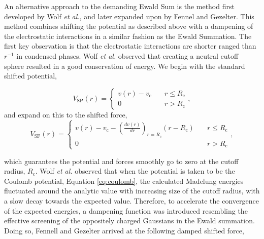 An alternative approach to the demanding Ewald Sum is the method first
developed by Wolf \textit{et al.}, and later expanded upon by Fennel
and Gezelter.\cite{Fennell2006} This method combines shifting the
potential as described above with a dampening of the electrostatic
interactions in a similar fashion as the Ewald Summation. The first
key observation is that the electrostatic interactions are shorter
ranged than $r^{-1}$ in condensed phases. Wolf \textit{et al.}
observed that creating a neutral cutoff sphere resulted in a
good conservation of energy. We begin with the standard shifted potential,

\begin{equation}
V_\textrm{SP}(r) =      \begin{cases}
v(r)-v_\textrm{c} &\quad r\leqslant R_\textrm{c} \\ 0 &\quad r >
R_\textrm{c}  
\end{cases},
\label{eq:shiftingPotForm}
\end{equation}
and expand on this to the shifted force,
\begin{equation}
V_\textrm{SF}(r) =      \begin{cases}
v(r)-v_\textrm{c}-\left(\frac{d v(r)}{d r}\right)_{r=R_\textrm{c}}(r-R_\textrm{c
})
&\quad r\leqslant R_\textrm{c} \\ 0 &\quad r > R_\textrm{c} 
                                                \end{cases},
\label{eq:shiftingForm}
\end{equation}

which guarantees the potential and forces smoothly go to zero at the
cutoff radius, $R_\textrm{c}$. Wolf \textit{et al.} observed that when
the potential is taken to be the Coulomb potential, Equation
\ref{eq:coulomb}, the calculated Madelung energies fluctuated around
the analytic value with increasing size of the cutoff radius, with a
slow decay towards the expected value. Therefore, to accelerate the
convergence of the expected energies, a dampening function was
introduced resembling the effective screening of the oppositely
charged Gaussians in the Ewald summation. Doing so, Fennell and
Gezelter arrived at the following damped shifted force,

